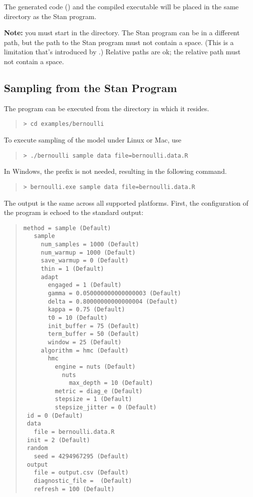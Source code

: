 The generated \Cpp code () and the compiled
executable will be placed in the same directory as the Stan program.

\textbf{Note:} you must start in the 
directory. The Stan program can be in a different path, but the path
to the Stan program must not contain a space. (This is a limitation
that's introduced by .) Relative paths are ok; the relative
path must not contain a space.

\subsection{Sampling from the Stan Program}

The program can be executed from the directory in which it resides.
%
\begin{quote}
\begin{Verbatim}[fontshape=sl]
> cd examples/bernoulli
\end{Verbatim}
\end{quote}
%
To execute sampling of the model under Linux or Mac, use
%
\begin{quote}
\begin{Verbatim}[fontshape=sl]
> ./bernoulli sample data file=bernoulli.data.R
\end{Verbatim}
\end{quote}
%
In Windows, the  prefix is not needed, resulting in the
following command.
%
\begin{quote}
\begin{Verbatim}[fontshape=sl]
> bernoulli.exe sample data file=bernoulli.data.R
\end{Verbatim}
\end{quote}
%
The output is the same across all supported platforms.  First, the
configuration of the program is echoed to the standard output:
%
\begin{quote}
\begin{Verbatim}[fontsize=\small]
 method = sample (Default)
   sample
     num_samples = 1000 (Default)
     num_warmup = 1000 (Default)
     save_warmup = 0 (Default)
     thin = 1 (Default)
     adapt
       engaged = 1 (Default)
       gamma = 0.050000000000000003 (Default)
       delta = 0.80000000000000004 (Default)
       kappa = 0.75 (Default)
       t0 = 10 (Default)
       init_buffer = 75 (Default)
       term_buffer = 50 (Default)
       window = 25 (Default)
     algorithm = hmc (Default)
       hmc
         engine = nuts (Default)
           nuts
             max_depth = 10 (Default)
         metric = diag_e (Default)
         stepsize = 1 (Default)
         stepsize_jitter = 0 (Default)
 id = 0 (Default)
 data
   file = bernoulli.data.R
 init = 2 (Default)
 random
   seed = 4294967295 (Default)
 output
   file = output.csv (Default)
   diagnostic_file =  (Default)
   refresh = 100 (Default)
\end{Verbatim}
\end{quote}
